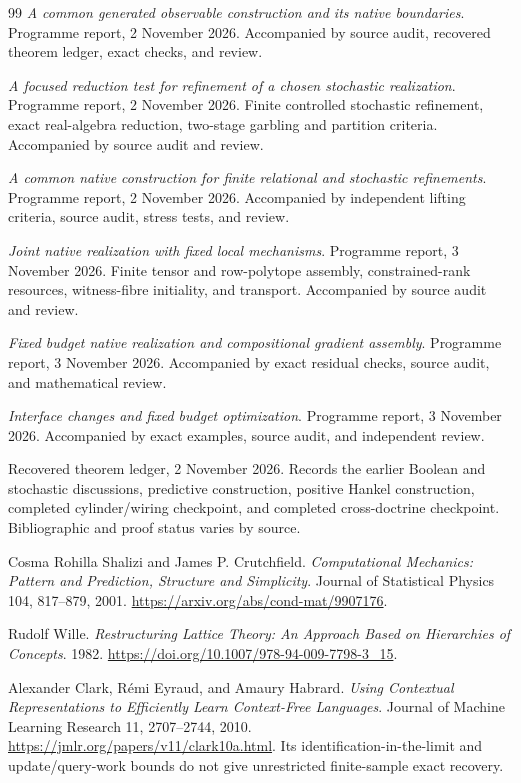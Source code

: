 \documentclass[11pt]{article}
\theoremstyle{remark}
\begin{document}
\begin{thebibliography}{99}
\emph{A common generated observable construction and its native boundaries}.
Programme report, 2 November 2026. Accompanied by source audit, recovered theorem ledger, exact checks, and review.

\emph{A focused reduction test for refinement of a chosen stochastic realization}. Programme report, 2 November 2026.
Finite controlled stochastic refinement, exact real-algebra reduction, two-stage garbling and partition criteria. Accompanied by source audit and review.

\emph{A common native construction for finite relational and stochastic refinements}.
Programme report, 2 November 2026. Accompanied by independent lifting criteria, source audit, stress tests, and review.

\emph{Joint native realization with fixed local mechanisms}.
Programme report, 3 November 2026. Finite tensor and row-polytope assembly, constrained-rank resources, witness-fibre initiality, and transport. Accompanied by source audit and review.

\emph{Fixed budget native realization and compositional gradient assembly}.
Programme report, 3 November 2026. Accompanied by exact residual checks, source audit, and mathematical review.

\emph{Interface changes and fixed budget optimization}.
Programme report, 3 November 2026. Accompanied by exact examples, source audit, and independent review.

Recovered theorem ledger, 2 November 2026.
Records the earlier Boolean and stochastic discussions, predictive construction, positive Hankel construction, completed cylinder/wiring checkpoint, and completed cross-doctrine checkpoint. Bibliographic and proof status varies by source.

Cosma Rohilla Shalizi and James P. Crutchfield.
\emph{Computational Mechanics: Pattern and Prediction, Structure and Simplicity}.
Journal of Statistical Physics 104, 817--879, 2001.
\url{https://arxiv.org/abs/cond-mat/9907176}.

Rudolf Wille. \emph{Restructuring Lattice Theory: An Approach Based on Hierarchies of Concepts}. 1982.
\url{https://doi.org/10.1007/978-94-009-7798-3_15}.

Alexander Clark, R\'emi Eyraud, and Amaury Habrard.
\emph{Using Contextual Representations to Efficiently Learn Context-Free Languages}.
Journal of Machine Learning Research 11, 2707--2744, 2010.
\url{https://jmlr.org/papers/v11/clark10a.html}.
Its identification-in-the-limit and update/query-work bounds do not give unrestricted finite-sample exact recovery.


\end{thebibliography}
\end{document}
